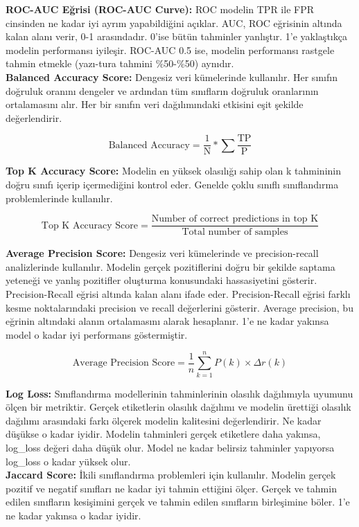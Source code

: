 \textbf{ROC-AUC Eğrisi (ROC-AUC Curve):} ROC modelin TPR ile FPR cinsinden ne kadar iyi ayrım yapabildiğini açıklar. AUC, ROC eğrisinin altında kalan alanı verir, 0-1 arasındadır. 0'ise bütün tahminler yanlıştır. 1'e yaklaştıkça modelin performansı iyileşir. ROC-AUC 0.5 ise, modelin performansı rastgele tahmin etmekle (yazı-tura tahmini \%50-\%50) aynıdır. \\

\textbf{Balanced Accuracy Score:} Dengesiz veri kümelerinde kullanılır. Her sınıfın doğruluk oranını dengeler ve ardından tüm sınıfların doğruluk oranlarının ortalamasını alır. Her bir sınıfın veri dağılımındaki etkisini eşit şekilde değerlendirir.

\[\text{Balanced Accuracy} = \frac{1}{\text{N}} * \sum{\frac{\text{TP}}{\text{P}}}\]

\textbf{Top K Accuracy Score:} Modelin en yüksek olasılığı sahip olan k tahmininin doğru sınıfı içerip içermediğini kontrol eder. Genelde çoklu sınıflı sınıflandırma problemlerinde kullanılır.

\[\text{Top K Accuracy Score} = \frac{\text{Number of correct predictions in top K}}{\text{Total number of samples}}\]

\textbf{Average Precision Score:} Dengesiz veri kümelerinde ve precision-recall analizlerinde kullanılır. Modelin gerçek pozitiflerini doğru bir şekilde saptama yeteneği ve yanlış pozitifler oluşturma konusundaki hassasiyetini gösterir. Precision-Recall eğrisi altında kalan alanı ifade eder. Precision-Recall eğrisi farklı kesme noktalarındaki precision ve recall değerlerini gösterir. Average precision, bu eğrinin altındaki alanın ortalamasını alarak hesaplanır. 1'e ne kadar yakınsa model o kadar iyi performans göstermiştir.

\[\text{Average Precision Score} = \frac{1}{n} \sum_{k=1}^{n} P(k) \times \Delta r(k)\]

\textbf{Log Loss:} Sınıflandırma modellerinin tahminlerinin olasılık dağılımıyla uyumunu ölçen bir metriktir. Gerçek etiketlerin olasılık dağılımı ve modelin ürettiği olasılık dağılımı arasındaki farkı ölçerek modelin kalitesini değerlendirir. Ne kadar düşükse o kadar iyidir. Modelin tahminleri gerçek etiketlere daha yakınsa, log\_loss değeri daha düşük olur. Model ne kadar belirsiz tahminler yapıyorsa log\_loss o kadar yüksek olur.\\

\textbf{Jaccard Score:} İkili sınıflandırma problemleri için kullanılır. Modelin gerçek pozitif ve negatif sınıfları ne kadar iyi tahmin ettiğini ölçer. Gerçek ve tahmin edilen sınıfların kesişimini gerçek ve tahmin edilen sınıfların birleşimine böler. 1'e ne kadar yakınsa o kadar iyidir.

